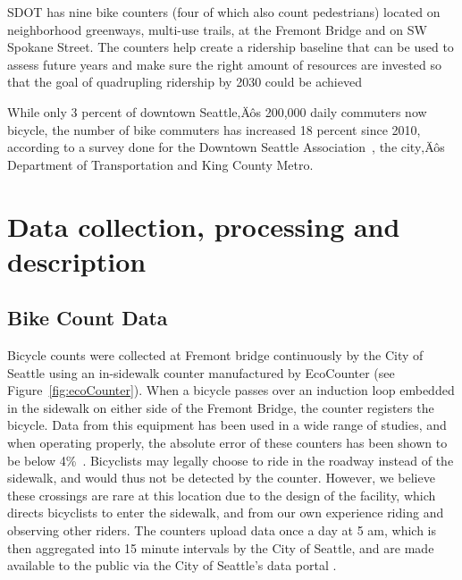 \documentclass [11pt, proquest] {uwthesis}[2015/03/03]
\begin{document}
SDOT has nine bike counters (four of which also count pedestrians) located on neighborhood greenways, multi-use trails, at the Fremont  Bridge and on SW Spokane Street. The counters help create a ridership baseline that can be used to assess future years and make sure the right amount of resources are invested so that the goal of quadrupling ridership by 2030 could be achieved~\cite{SDOT_BMP15}

While only 3 percent of downtown Seattle‚Äôs 200,000 daily commuters now bicycle, the number of bike commuters has increased 18 percent since 2010, according to a survey done for the Downtown Seattle Association~\cite{}, the city‚Äôs Department of Transportation and King County Metro.

\section{Data collection, processing and description}
\label{sec:data}

\subsection{Bike Count Data}
Bicycle counts were collected at Fremont bridge continuously by the City of Seattle using an in-sidewalk counter manufactured by EcoCounter (see Figure~\ref{fig:ecoCounter}). When a bicycle passes over an induction loop embedded in the sidewalk on either side of the Fremont Bridge, the counter
registers the bicycle. Data from this equipment has been used in a wide range of studies, and when operating properly, the absolute error of these counters has been shown to be below 4\%~\cite{Nordback09}. Bicyclists may legally choose to ride in the roadway instead of the sidewalk, and would thus not be detected by the counter. However, we believe these crossings are rare at this location due to the design of the facility, which directs bicyclists to enter the sidewalk, and from our own experience riding and observing other riders. The counters upload data once a day at 5 am, which is then aggregated into 15 minute intervals by the City of Seattle, and are made available to the public via the City of Seattle's data portal \cite{City-of-Seattle:aa,City-of-Seattle:ab}.
\end{document}
